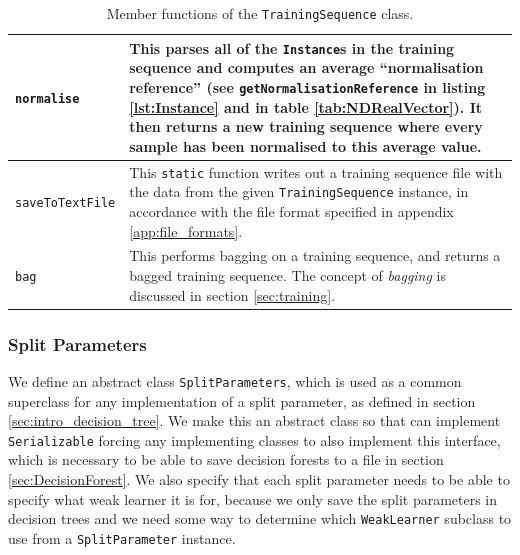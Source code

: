 \documentclass[12pt,twoside,notitlepage]{report}
\begin{document}
\begin{table}[H]
\begin{tabularx}{\textwidth}{p{4.5cm}|X}
                        \texttt{normalise} & 
                            This parses all of the \texttt{Instance}s in the training sequence and computes an average 
                            ``normalisation reference'' (see \texttt{getNormalisationReference} in listing 
                            \ref{lst:Instance} and in table \ref{tab:NDRealVector}). It then returns a new training 
                            sequence where every sample has been normalised to this average value. \\
                        \hline

                        \texttt{saveToTextFile} & 
                            This \texttt{static} function writes out a training sequence file with the data from the 
                            given \texttt{TrainingSequence} instance, in accordance with the file format specified in 
                            appendix \ref{app:file_formats}. \\
                        \hline

                        \texttt{bag} &
                            This performs bagging on a training sequence, and returns a bagged training sequence. The 
                            concept of \textit{bagging} is discussed in section \ref{sec:training}.

                    \end{tabularx}
                    \caption{Member functions of the \texttt{TrainingSequence} class.}
                    \label{tab:TrainingSequence}
                \end{table}





            \subsubsection{Split Parameters} \label{sec:split_params}
                We define an abstract class \texttt{SplitParameters}, which is used as a common superclass for any 
                implementation of a split parameter, as defined in section \ref{sec:intro_decision_tree}. We 
                make this an abstract class so that can implement \texttt{Serializable} forcing
                any implementing classes to also implement this interface, which is 
                necessary to be able to save decision forests to a file in section \ref{sec:DecisionForest}. 
                We also specify that each split parameter needs to be 
                able to specify what weak learner it is for, because we only save the split parameters in 
                decision trees and we need some way to determine which \texttt{WeakLearner} subclass to use from a 
                \texttt{SplitParameter} instance. 
\end{document}
